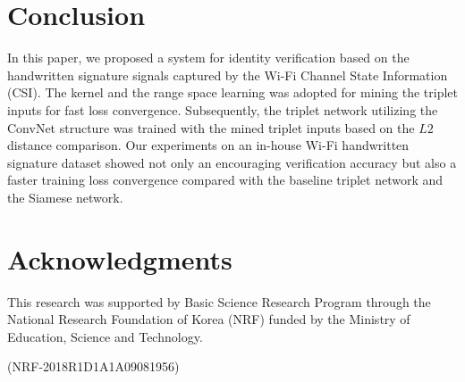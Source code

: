 \documentclass{sig-alternate-05-2015}
\begin{document}
\section{Conclusion}
In this paper, we proposed a system for identity verification based on the handwritten signature signals captured by the Wi-Fi Channel State Information (CSI). 
The kernel and the range space learning was adopted for mining the triplet inputs for fast loss convergence. 
Subsequently, the triplet network utilizing the ConvNet structure was trained with the mined triplet inputs based on the $L2$ distance comparison. 
Our experiments on an in-house Wi-Fi handwritten signature dataset showed not only an encouraging verification accuracy but also a faster training loss convergence compared with the baseline triplet network and the Siamese network.

\section{Acknowledgments}
This research was supported by Basic Science Research
Program through the National Research Foundation of Korea
(NRF) funded by the Ministry of Education, Science and
Technology.

\noindent(NRF-2018R1D1A1A09081956)

%
%

%
%
\end{document}
